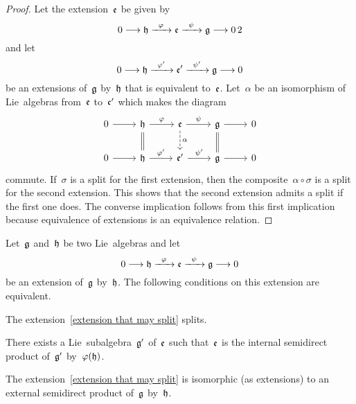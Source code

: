 \begin{proof}
	Let the extension~$\mathfrak{e}$ be given by
	\[
		0
		\to
		\hlie
		\xto{\varphi}
		\elie
		\xto{\psi}
		\glie
		\to
		0 \,2
	\]
	and let
	\[
		0
		\to
		\hlie
		\xto{\varphi'}
		\elie'
		\xto{\psi'}
		\glie
		\to
		0
	\]
	be an extensions of~$\mathfrak{g}$ by~$\mathfrak{h}$ that is equivalent to~$\mathfrak{e}$.
	Let~$\alpha$ be an isomorphism of Lie~algebras from~$\mathfrak{e}$ to~$\mathfrak{e}'$ which makes the diagram
	\[
		\begin{tikzcd}
			0
			\arrow{r}
			&
			\hlie
			\arrow{r}[above]{\varphi}
			\arrow[equal]{d}
			&
			\elie
			\arrow{r}[above]{\psi}
			\arrow[dashed]{d}[right]{\alpha}
			&
			\glie
			\arrow{r}
			\arrow[equal]{d}
			&
			0
			\\
			0
			\arrow{r}
			&
			\hlie
			\arrow{r}[above]{\varphi'}
			&
			\elie'
			\arrow{r}[above]{\psi'}
			&
			\glie
			\arrow{r}
			&
			0
		\end{tikzcd}
	\]
	commute.
	If~$\sigma$ is a split for the first extension, then the composite~$\alpha \circ \sigma$ is a split for the second extension.
	This shows that the second extension admits a split if the first one does.
	The converse implication follows from this first implication because equivalence of extensions is an equivalence relation.
\end{proof}


\begin{proposition}
	Let~$\mathfrak{g}$ and~$\mathfrak{h}$ be two Lie~algebras and let
	\begin{equation}
		\label{extension that may split}
		0
		\to
		\hlie
		\xto{\varphi}
		\elie
		\xto{\psi}
		\glie
		\to
		0
	\end{equation}
	be an extension of~$\mathfrak{g}$ by~$\mathfrak{h}$.
	The following conditions on this extension are equivalent.
	\begin{equivalenceslist}
		\item
			\label{the extension splits}
			The extension~\eqref{extension that may split} splits.
		\item
			\label{is an internal semidirect product}
			There exists a Lie~subalgebra~$\mathfrak{g}'$ of~$\mathfrak{e}$ such that~$\mathfrak{e}$ is the internal semidirect product of~$\mathfrak{g}'$ by~$\varphi(\mathfrak{h})$.
		\item
			\label{is an external semidirect product}
			The extension~\eqref{extension that may split} is isomorphic (as extensions) to an external semidirect product of~$\mathfrak{g}$ by~$\mathfrak{h}$.
	\end{equivalenceslist}
\end{proposition}


